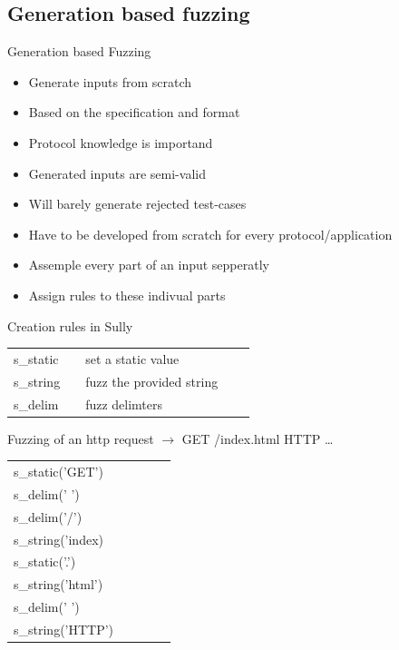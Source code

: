 \documentclass{beamer}
\begin{document}
\subsection{Generation based fuzzing}
\begin{frame}{Generation based Fuzzing}
 \begin{itemize}
  \item Generate inputs from scratch
  \item Based on the specification and format
  \item Protocol knowledge is importand
  \item Generated inputs are semi-valid
  \item Will barely generate rejected test-cases
  \item Have to be developed from scratch for every protocol/application 
  
 \end{itemize}
\end{frame}
\begin{frame}
 \begin{itemize}
   \item Assemple every part of an input sepperatly
   \item Assign rules to these indivual parts
  \end{itemize}
 
\end{frame}
\begin{frame}{Creation rules in Sully}
\begin{table}[]
\begin{tabular}{lllll}
s\_static  &  &  set a static value  \\
s\_string  &  &  fuzz the provided string  \\
s\_delim  &  &   fuzz delimters  \\
\end{tabular}
\end{table}
\end{frame}

\begin{frame}{Fuzzing of an http request}
 $\rightarrow$ GET /index.html HTTP \dots

\begin{center}

 \begin{table}[]
 \begin{tabular}{lllll}
 s\_static('GET')  &  &  &  \\
  s\_delim(' ')\\
 s\_delim('/')\\
    s\_string('index)\\
   s\_static('.')  &  \\
 s\_string('html')\\
 s\_delim(' ')\\
 s\_string('HTTP')&  &  & 
 \end{tabular}
 \end{table}
  
 \end{center}

\end{frame}
\end{document}
